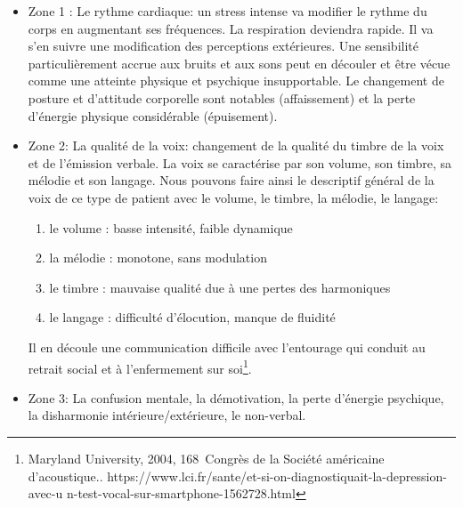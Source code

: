 \begin{itemize}
  	\item Zone 1 :  Le rythme cardiaque: un stress intense va modifier le rythme
  du corps en augmentant ses fréquences. La respiration deviendra
  rapide. Il va s'en suivre une modification des perceptions
  extérieures. Une sensibilité particulièrement accrue aux bruits et
  aux sons peut en découler et être vécue comme une
  atteinte physique et psychique insupportable.
  Le changement de posture et d'attitude corporelle sont
notables (affaissement) et la perte d'énergie physique considérable (épuisement).
	\item Zone 2: La qualité de la voix: changement de la qualité du timbre de la
 voix et de l'émission verbale.	
  La voix se caractérise par son volume, son timbre, sa mélodie et son langage. 
	 Nous pouvons faire ainsi le
        descriptif général de la voix de ce type de patient avec le volume, le timbre, la
        mélodie, le langage: 
 	\begin{enumerate}
 		\item le volume : basse intensité, faible dynamique
 		\item la mélodie : monotone, sans modulation
 		\item le timbre : mauvaise qualité due à une pertes des harmoniques
 		\item le langage : difficulté d'élocution, manque de fluidité
 	\end{enumerate}
        Il en découle une communication difficile avec l'entourage qui  conduit au retrait social et à l'enfermement sur soi\footnote{Maryland University, 2004, 168\ieme\ Congrès de la Société
américaine d'acoustique.\autocite{le_service_metronews}. https://www.lci.fr/sante/et-si-on-diagnostiquait-la-depression-avec-u
n-test-vocal-sur-smartphone-1562728.html}.
        
	\item Zone 3: La confusion mentale, la démotivation, la perte d'énergie
psychique, la disharmonie intérieure/extérieure, le non-verbal.
\end{itemize}

